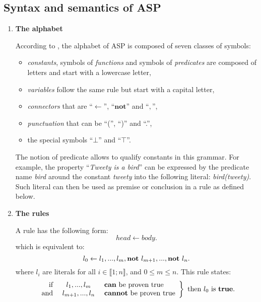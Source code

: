 \subsection*{Syntax and semantics of ASP}
\label{sectionSyntaxeASP}
\begin{enumerate}

\item \textbf{The alphabet}

According to \cite{baral2003knowledge}, the alphabet of ASP is composed of seven classes of symbols:
\begin{itemize}
  \item \emph{constants}, symbols of \emph{functions} and symbols of \emph{predicates} are composed of letters and start with a lowercase letter,
  \item \emph{variables} follow the same rule but start with a capital letter,
  \item \emph{connectors} that are ``$\leftarrow$'', ``$\textbf{not}$'' and ``$,$'',
  \item \emph{punctuation} that can be ``('', ``)'' and ``.'',
  \item the special symbols ``$\bot$'' and ``$\top$''.
\end{itemize}

The notion of predicate allows to qualify constants in this grammar.
For example, the property ``\textit{Tweety is a bird}''
can be expressed by the predicate name \textit{bird}
around the constant \textit{tweety} into the following literal:
\textit{bird(tweety)}.
Such literal can then be used as premise or conclusion in a rule as defined below.

\item \textbf{The rules}

A rule has the following form:
\begin{equation} \label{eq1ASP}
 head \leftarrow body.
\end{equation}
which is equivalent to:
\begin{equation} \label{eq2ASP}
l_{0} \leftarrow l_{1},...,l_{m}, \textbf{not}~ l_{m+1},..., \textbf{not}~ l_{n}.
\end{equation}
where $l_{i}$ are literals for all $i \in \llbracket 1 ; n \rrbracket$, and $0 \leq m \leq n$.
This rule states:
\[
\left.
    \begin{array}{rcl}
        \text{if } & l_{1},...,l_{m}  & \text{ \textbf{can} be proven true}\\
        \text{and } & l_{m+1},...,l_{n} & \text{ \textbf{cannot} be proven true}
    \end{array}
\right \} \text{ then} ~ l_{0} ~ \text{is } \textbf{true}.
\]


\end{enumerate}
